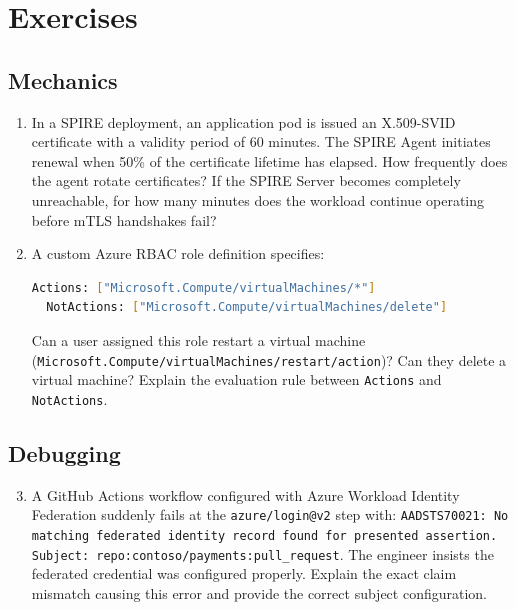 \section{Exercises}

\subsection{Mechanics}
\begin{enumerate}[leftmargin=18pt]
  \item In a SPIRE deployment, an application pod is issued an X.509-SVID certificate with a validity period of 60 minutes. The SPIRE Agent initiates renewal when 50\% of the certificate lifetime has elapsed. How frequently does the agent rotate certificates? If the SPIRE Server becomes completely unreachable, for how many minutes does the workload continue operating before mTLS handshakes fail?
  \item A custom Azure RBAC role definition specifies:
  \begin{lstlisting}[language=bash]
  Actions: ["Microsoft.Compute/virtualMachines/*"]
  NotActions: ["Microsoft.Compute/virtualMachines/delete"]
  \end{lstlisting}
  Can a user assigned this role restart a virtual machine (\texttt{Microsoft.Compute/virtualMachines/restart/action})? Can they delete a virtual machine? Explain the evaluation rule between \texttt{Actions} and \texttt{NotActions}.
\end{enumerate}

\subsection{Debugging}
\begin{enumerate}[leftmargin=18pt]
  \setcounter{enumi}{2}
  \item A GitHub Actions workflow configured with Azure Workload Identity Federation suddenly fails at the \texttt{azure/login@v2} step with: \texttt{AADSTS70021: No matching federated identity record found for presented assertion. Subject: repo:contoso/payments:pull\_request}. The engineer insists the federated credential was configured properly. Explain the exact claim mismatch causing this error and provide the correct subject configuration.
\end{enumerate}

